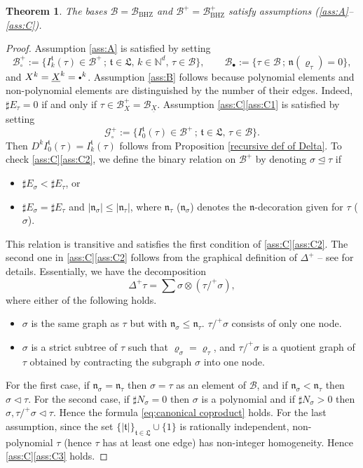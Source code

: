 \documentclass[10pt]{amsart}
\newcommand{\sbullet}{{\scriptscriptstyle\bullet}}
\newcommand{\scbullet}{{\raisebox{1pt}{$\sbullet$}}}
\theoremstyle{plain}
\newtheorem{thm}{Theorem}
\theoremstyle{definition}
\newcommand{\BHZ}{{\scriptscriptstyle\mathrm{BHZ}}}
\newcommand{\bsmcB}{\boldsymbol{\mathcal{B}}}
\newcommand{\frkL}{\mathfrak{L}}
\newcommand{\frkt}{\mathfrak{t}}
\newcommand{\frkn}{\mathfrak{n}}
\let\pord\trianglelefteq
\let\spord\triangleleft
\newcommand{\bbN}{\mathbb{N}}
\newcommand{\mcB}{\mathcal{B}}
\newcommand{\mcG}{\mathcal{G}}
\begin{document}
\begin{thm}\label{BHZ-ABC}
The bases $\mcB=\mcB_{\BHZ}$ and $\mcB^+=\mcB_{\BHZ}^+$ satisfy assumptions \textup{(\ref{ass:A}--\ref{ass:C})}.
\end{thm}

\begin{proof}
Assumption \eqref{ass:A} is satisfied by setting
\[
\mcB_\circ^+:=\{I_k^{\frkt}(\tau)\in\mcB^+\,;\, \frkt\in\frkL,\, k\in\bbN^d,\, \tau\in\mcB\},\qquad
\mcB_\sbullet:=\{\tau\in\mcB\,;\, \frkn(\varrho_\tau)=0\},
\]
and $X^k=\underline{X}^k=\scbullet^k$.
Assumption \eqref{ass:B} follows because polynomial elements and non-polynomial elements are distinguished by the number of their edges. Indeed, $\sharp E_\tau=0$ if and only if $\tau\in\mcB_X^+=\mcB_{\underline{X}}$.
Assumption \ref{ass:C}\eqref{ass:C1} is satisfied by setting
\[
\mcG_\circ^+:=\{I_0^{\frkt}(\tau)\in\mcB^+\,;\, \frkt\in\frkL,\, \tau\in\mcB\}.
\]
Then $D^kI_0^{\frkt}(\tau)=I_k^{\frkt}(\tau)$ follows from Proposition \ref{recursive def of Delta}.
To check \ref{ass:C}\eqref{ass:C2}, we define the binary relation on $\mcB^+$ by denoting $\sigma\pord\tau$ if
\begin{itemize}
\item $\sharp E_\sigma<\sharp E_\tau$, or
\item $\sharp E_\sigma=\sharp E_\tau$ and $|\frkn_\sigma|\le|\frkn_\tau|$, where $\frkn_\tau$ (\resp $\frkn_\sigma$) denotes the $\frkn$-decoration given for $\tau$ (\resp $\sigma$).
\end{itemize}
This relation is transitive and satisfies the first condition of \ref{ass:C}\eqref{ass:C2}.
The second one in \ref{ass:C}\eqref{ass:C2} follows from the graphical definition of $\Delta^+$ -- see \cite[\S2]{BHZ} for details. Essentially, we have the decomposition
\[
\Delta^+\tau=\sum\sigma\otimes(\tau/^+\sigma),
\]
where either of the following holds.
\begin{itemize}
\item $\sigma$ is the same graph as $\tau$ but with $\frkn_\sigma\le\frkn_\tau$.
$\tau/^+\sigma$ consists of only one node.
\item $\sigma$ is a strict subtree of $\tau$ such that $\varrho_\sigma=\varrho_\tau$, and $\tau/^+\sigma$ is a quotient graph of $\tau$ obtained by contracting the subgraph $\sigma$ into one node.
\end{itemize}
For the first case, if $\frkn_\sigma=\frkn_\tau$ then $\sigma=\tau$ as an element of $\bsmcB$, and if $\frkn_\sigma<\frkn_\tau$ then $\sigma\spord\tau$.
For the second case, if $\sharp N_\sigma=0$ then $\sigma$ is a polynomial and if $\sharp N_\sigma>0$ then $\sigma,\tau/^+\sigma\spord\tau$.
Hence the formula \eqref{eq:canonical coproduct} holds.
For the last assumption, since the set $\{|\mathfrak{t}|\}_{\mathfrak{t}\in\mathfrak{L}}\cup\{1\}$ is rationally independent, non-polynomial $\tau$ (hence $\tau$ has at least one edge) has non-integer homogeneity. Hence \ref{ass:C}\eqref{ass:C3} holds.
\end{proof}
\end{document}
